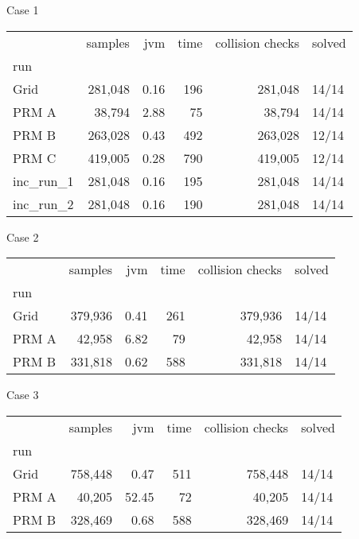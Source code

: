 Case 1
\begin{tabular}{lrrrrl}
\toprule
{} & samples &  jvm & time & collision checks & solved \\
run       &         &      &      &                  &        \\
\midrule
Grid      & 281,048 & 0.16 &  196 &          281,048 &  14/14 \\
PRM A     &  38,794 & 2.88 &   75 &           38,794 &  14/14 \\
PRM B     & 263,028 & 0.43 &  492 &          263,028 &  12/14 \\
PRM C     & 419,005 & 0.28 &  790 &          419,005 &  12/14 \\
inc\_run\_1 & 281,048 & 0.16 &  195 &          281,048 &  14/14 \\
inc\_run\_2 & 281,048 & 0.16 &  190 &          281,048 &  14/14 \\
\bottomrule
\end{tabular}


Case 2
\begin{tabular}{lrrrrl}
\toprule
{} & samples &  jvm & time & collision checks & solved \\
run   &         &      &      &                  &        \\
\midrule
Grid  & 379,936 & 0.41 &  261 &          379,936 &  14/14 \\
PRM A &  42,958 & 6.82 &   79 &           42,958 &  14/14 \\
PRM B & 331,818 & 0.62 &  588 &          331,818 &  14/14 \\
\bottomrule
\end{tabular}


Case 3
\begin{tabular}{lrrrrl}
\toprule
{} & samples &   jvm & time & collision checks & solved \\
run   &         &       &      &                  &        \\
\midrule
Grid  & 758,448 &  0.47 &  511 &          758,448 &  14/14 \\
PRM A &  40,205 & 52.45 &   72 &           40,205 &  14/14 \\
PRM B & 328,469 &  0.68 &  588 &          328,469 &  14/14 \\
\bottomrule
\end{tabular}


